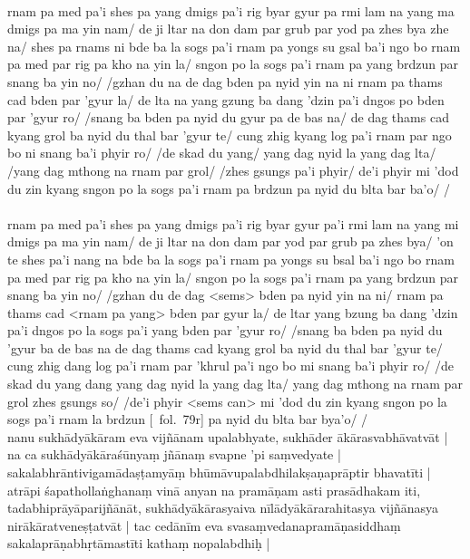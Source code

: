 \documentclass[12pt]{article}
\begin{document}
\textbf{\TVA}\\
rnam pa med pa'i shes pa yang dmigs pa'i rig byar gyur pa rmi lam na yang ma dmigs pa ma yin nam/ de ji ltar na don dam par grub par yod pa zhes bya zhe na/ shes pa rnams ni bde ba la sogs pa'i rnam pa yongs su gsal ba'i ngo bo rnam pa med par rig pa kho na yin la/ sngon po la sogs pa'i rnam pa yang brdzun par snang ba yin no/ /gzhan du na de dag bden pa nyid yin na ni rnam pa thams cad bden par 'gyur la/ de lta na yang gzung ba dang 'dzin pa'i dngos po bden par 'gyur ro/ /snang ba bden pa nyid du gyur pa de bas na/ de dag thams cad kyang grol ba nyid du thal bar 'gyur te/ cung zhig kyang log pa'i rnam par ngo bo ni snang ba'i phyir ro/ /de skad du yang/ yang dag nyid la yang dag lta/ /yang dag mthong na rnam par grol/ /zhes gsungs pa'i phyir/ de'i phyir mi 'dod du zin kyang sngon po la sogs pa'i rnam pa brdzun pa nyid du blta bar ba'o/ /\\

\textbf{\TVB}\\
rnam pa med pa'i shes pa yang dmigs pa'i rig byar gyur pa'i rmi lam na yang mi dmigs pa ma yin nam/ de ji ltar na don dam par yod par grub pa zhes bya/ 'on te shes pa'i nang na bde ba la sogs pa'i rnam pa yongs su bsal ba'i ngo bo rnam pa med par rig pa kho na yin la/ sngon po la sogs pa'i rnam pa yang brdzun par snang ba yin no/ /gzhan du de dag <sems> bden pa nyid yin na ni/ rnam pa thams cad <rnam pa yang> bden par gyur la/ de ltar yang bzung ba dang 'dzin pa'i dngos po la sogs pa'i yang bden par 'gyur ro/ /snang ba bden pa nyid du 'gyur ba de bas na de dag thams cad kyang grol ba nyid du thal bar 'gyur te/ cung zhig dang log pa'i rnam par 'khrul pa'i ngo bo mi snang ba'i phyir ro/ /de skad du yang dang yang dag nyid la yang dag lta/ yang dag mthong na rnam par grol zhes gsungs so/ /de'i phyir <sems can> mi 'dod du zin kyang sngon po la sogs pa'i rnam la brdzun [\TVB\ fol.\ 79r] pa nyid du blta bar bya'o/ /\\

nanu sukhādyākāram eva vijñānam upalabhyate, sukhāder ākārasvabhāvatvāt | na ca sukhādyākāraśūnyaṃ jñānaṃ svapne 'pi saṃvedyate | sakalabhrāntivigamādaṣṭamyāṃ bhūmāvupalabdhilakṣaṇaprāptir bhavatīti | atrāpi śapathollaṅghanaṃ vinā anyan na pramāṇam asti prasādhakam iti, tadabhiprāyāparijñānāt, sukhādyākārasyaiva nīlādyākārarahitasya vijñānasya nirākāratveneṣṭatvāt | tac cedānīm eva svasaṃvedanapramāṇasiddhaṃ sakalaprāṇabhṛtāmastīti kathaṃ nopalabdhiḥ |\\
\end{document}
